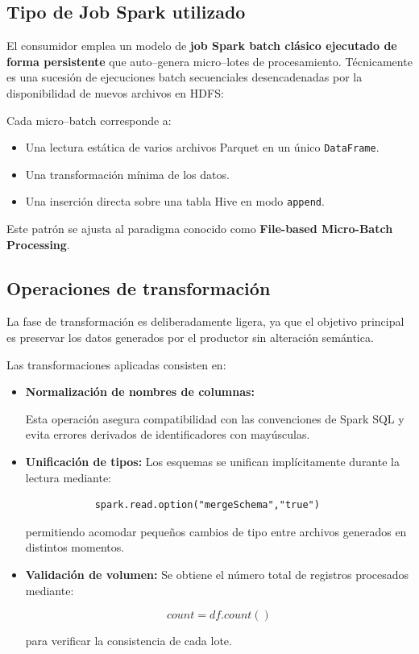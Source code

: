 \documentclass[12pt,a4paper]{article}
\begin{document}
	\subsection{Tipo de Job Spark utilizado}
	
	El consumidor emplea un modelo de \textbf{job Spark batch clásico ejecutado de forma persistente} que auto–genera micro–lotes de procesamiento. Técnicamente es una sucesión de ejecuciones batch secuenciales desencadenadas por la disponibilidad de nuevos archivos en HDFS:

	Cada micro–batch corresponde a:
	
	\begin{itemize}
		\item Una lectura estática de varios archivos Parquet en un único \texttt{DataFrame}.
		\item Una transformación mínima de los datos.
		\item Una inserción directa sobre una tabla Hive en modo \texttt{append}.
	\end{itemize}
	
	Este patrón se ajusta al paradigma conocido como \textbf{File-based Micro-Batch Processing}.
	
	\subsection{Operaciones de transformación}
	
	La fase de transformación es deliberadamente ligera, ya que el objetivo principal es preservar los datos generados por el productor sin alteración semántica.
	
	Las transformaciones aplicadas consisten en:
	
	\begin{itemize}
		\item \textbf{Normalización de nombres de columnas:}
		
		Esta operación asegura compatibilidad con las convenciones de Spark SQL y evita errores derivados de identificadores con mayúsculas.
		
		\item \textbf{Unificación de tipos:}
		Los esquemas se unifican implícitamente durante la lectura mediante:
		\begin{verbatim}
			spark.read.option("mergeSchema","true")
		\end{verbatim}
		
		permitiendo acomodar pequeños cambios de tipo entre archivos generados en distintos momentos.
		
		\item \textbf{Validación de volumen:}
		Se obtiene el número total de registros procesados mediante:
		
		\[
		count = df.count()
		\]
		
		para verificar la consistencia de cada lote.
		
	\end{itemize}
	
\end{document}
